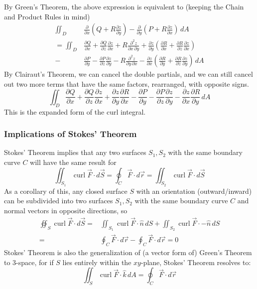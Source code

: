 \documentclass{article}
\DeclareMathOperator{\curl}{curl}
\newcommand{\vect}[1]{\ensuremath{\overrightarrow{#1}}}
\begin{document}
By Green's Theorem, the above expression is equivalent to (keeping the Chain and Product Rules in mind)
\begin{align*}
    \iint_D&\frac{\partial}{\partial x}\left(Q + R\frac{\partial z}{\partial y}\right) - \frac{\partial}{\partial y}\left(P + R\frac{\partial z}{\partial x} \right)\,dA\\
    = \iint_D&\frac{\partial Q}{\partial x} + \frac{\partial Q}{\partial z}\frac{\partial z}{\partial x}+ R\frac{\partial^2z}{\partial x\,\partial y}+\frac{\partial z}{\partial y} \left(\frac{\partial R}{\partial x} + \frac{\partial R}{\partial z}\frac{\partial z}{\partial x}\right) \\-&\frac{\partial P}{\partial y} - \frac{\partial P}{\partial z}\frac{\partial z}{\partial y} - R\frac{\partial^2 z}{\partial y\,\partial x} - \frac{\partial z}{\partial x}\left(\frac{\partial R}{\partial y } + \frac{\partial R}{\partial z}\frac{\partial z}{\partial y}{}\right)\,dA
\end{align*}
By Clairaut's Theorem, we can cancel the double partials, and we can still cancel out two more terms that have the same factors, rearranged, with opposite signs.
\[
    \iint_D\frac{\partial Q}{\partial x} +\frac{\partial Q}{\partial z}\frac{\partial z}{\partial x} + \frac{\partial z}{\partial y} \frac{\partial R}{\partial x} - \frac{\partial P}{\partial y} -  \frac{\partial P}{\partial z}\frac{\partial z}{\partial y} - \frac{\partial z}{\partial x}\frac{\partial R}{\partial y} \,dA
\]
This is the expanded form of the curl integral.

\subsubsection{Implications of Stokes' Theorem}
Stokes' Theorem implies that any two surfaces $S_1,S_2$ with the same boundary curve $C$ will have the same result for $$\iint_{S_1}\curl\vect{F}\cdot d\vect{S} = \oint_C\vect{F}\cdot d\vect{r} = \iint_{S_2}\curl\vect{F}\cdot d\vect{S}$$
As a corollary of this, any closed surface $S$ with an orientation (outward/inward) can be subdivided into two surfaces $S_1,S_2$ with the same boundary curve $C$ and normal vectors in opposite directions, so
\begin{align*}
    \oiint_S \curl\vect{F}\cdot d\vect{S} =& \iint_{S_1}\curl\vect{F}\cdot\hat{n}\,dS + \iint_{S_2}\curl\vect{F}\cdot-\hat{n}\,dS \\=& \oint_C\vect{F}\cdot d\vect{r} - \oint_C\vect{F}\cdot d\vect{r} = 0
\end{align*}
Stokes' Theorem is also the generalization of (a vector form of) Green's Theorem to 3-space, for if $S$ lies entirely within the $xy$-plane, Stokes' Theorem resolves to:
$$\iint_S \curl\vect{F}\cdot\hat{k}\,dA = \oint_C \vect{F}\cdot d\vect{r}$$
\end{document}
